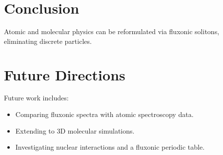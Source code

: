 \documentclass{article}
\begin{document}
\section{Conclusion}
Atomic and molecular physics can be reformulated via fluxonic solitons, eliminating discrete particles.

\section{Future Directions}
Future work includes:
\begin{itemize}
    \item Comparing fluxonic spectra with atomic spectroscopy data.
    \item Extending to 3D molecular simulations.
    \item Investigating nuclear interactions and a fluxonic periodic table.
\end{itemize}
\end{document}
